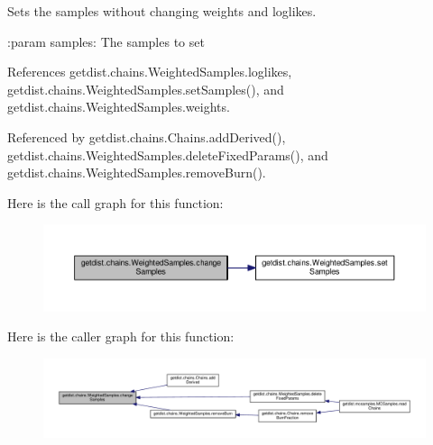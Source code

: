 \begin{DoxyVerb}Sets the samples without changing weights and loglikes.

:param samples: The samples to set
\end{DoxyVerb}
 

References getdist.\+chains.\+Weighted\+Samples.\+loglikes, getdist.\+chains.\+Weighted\+Samples.\+set\+Samples(), and getdist.\+chains.\+Weighted\+Samples.\+weights.



Referenced by getdist.\+chains.\+Chains.\+add\+Derived(), getdist.\+chains.\+Weighted\+Samples.\+delete\+Fixed\+Params(), and getdist.\+chains.\+Weighted\+Samples.\+remove\+Burn().

Here is the call graph for this function\+:
\nopagebreak
\begin{figure}[H]
\begin{center}
\leavevmode
\includegraphics[width=350pt]{classgetdist_1_1chains_1_1WeightedSamples_a653635d220dbf602c06118de80e224fe_cgraph}
\end{center}
\end{figure}
Here is the caller graph for this function\+:
\nopagebreak
\begin{figure}[H]
\begin{center}
\leavevmode
\includegraphics[width=350pt]{classgetdist_1_1chains_1_1WeightedSamples_a653635d220dbf602c06118de80e224fe_icgraph}
\end{center}
\end{figure}
\mbox{\label{classgetdist_1_1chains_1_1WeightedSamples_aafea7daa99724b91392e41c4157a29a0}} 

